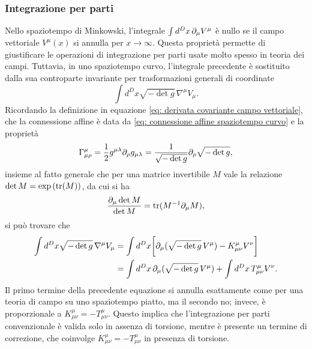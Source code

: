 \subsubsection{Integrazione per parti}
Nello spaziotempo di Minkowski, l'integrale $\int d^Dx\,\partial_\mu V^\mu$ è nullo se il campo vettoriale $V^\mu(x)$ si annulla per $x \to \infty$. Questa proprietà permette di giustificare le operazioni di integrazione per parti usate molto spesso in teoria dei campi. Tuttavia, in uno spaziotempo curvo, l'integrale precedente è sostituito dalla sua controparte invariante per trasformazioni generali di coordinate 
\begin{equation}
    \int d^Dx\sqrt{-\det{g}}\,\nabla^\mu V_\mu.
\end{equation}
Ricordando la definizione in equazione \eqref{eq: derivata covariante campo vettoriale}, che la connessione affine è data da \eqref{eq: connessione affine spaziotempo curvo} e la proprietà
\begin{equation}
    \Gamma^\mu_{\mu\rho} = \frac{1}{2}g^{\mu\lambda}\partial_\rho g_{\mu\lambda} = \frac{1}{\sqrt{-\det{g}}}\partial_\rho\sqrt{-\det{g}},
\end{equation}
insieme al fatto generale che per una matrice invertibile $M$ vale la relazione $\det{M} = \exp{(\mathrm{tr}{(M)})}$, da cui si ha
\begin{equation}
    \frac{\partial_\mu\det{M}}{\det{M}} = \mathrm{tr}{(M^{-1}\partial_\mu M)},
\end{equation}
si può trovare che 
\begin{equation}
    \begin{split}
        \int d^Dx\sqrt{-\det{g}}\,\nabla^\mu V_\mu &= \int d^Dx\bigg[\partial_\mu(\sqrt{-\det{g}}\,V^\mu) - K^\mu_{\mu\nu}V^\nu\bigg] \\
        &= \int d^Dx\,\partial_\mu(\sqrt{-\det{g}}\,V^\mu) + \int d^Dx\,T^\mu_{\mu\nu}V^\nu.
    \end{split}
\end{equation}
Il primo termine della precedente equazione si annulla esattamente come per una teoria di campo su uno spaziotempo piatto, ma il secondo no; invece, è proporzionale a $K^\mu_{\mu\nu} = -T^\mu_{\mu\nu}$. Questo implica che l'integrazione per parti convenzionale è valida solo in assenza di torsione, mentre è presente un termine di correzione, che coinvolge $K^\mu_{\mu\nu} = -T^\mu_{\mu\nu}$ in presenza di torsione.